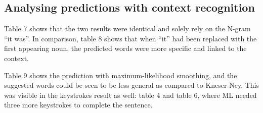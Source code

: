 \subsection{Analysing predictions with context recognition}
Table 7 shows that the two results were identical and solely rely on the N-gram “it was”. In comparison, table 8 shows that when “it” had been replaced with the first appearing noun, the predicted words were more specific and linked to the context.

Table 9 shows the prediction with maximum-likelihood smoothing, and the suggested words could be seen to be less general as compared to Kneser-Ney. This was visible in the keystrokes result as well: table 4 and table 6, where ML needed three more keystrokes to complete the sentence.